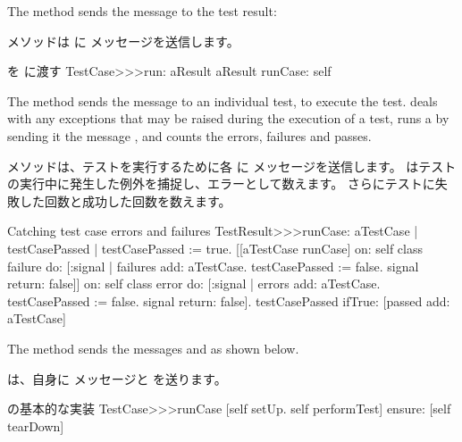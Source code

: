 \documentclass[a4paper,10pt,twoside]{book}
\begin{document}
The method
 sends the message
 to the test result:
\fi

 メソッドは  に  メッセージを送信します。

\begin{method}[testcaserun:]{ を  に渡す}
TestCase>>>run: aResult
	aResult runCase: self
\end{method}

The method  sends
the message  to an individual test, to execute the test.
 deals with 
any exceptions that may be raised during the
execution of a test, runs a  by sending it the
message , and counts the errors, failures
and passes.
\fi

 メソッドは、テストを実行するために各  に  メッセージを送信します。
 はテストの実行中に発生した例外を捕捉し、エラーとして数えます。
さらにテストに失敗した回数と成功した回数を数えます。

\begin{method}[testresultruncase]{Catching test case errors and failures}
TestResult>>>runCase: aTestCase
	| testCasePassed |
	testCasePassed := true.
	[[aTestCase runCase] 
			on: self class failure
			do: 
				[:signal | 
				failures add: aTestCase.
				testCasePassed := false.
				signal return: false]]
					on: self class error
					do:
						[:signal |
						errors add: aTestCase.
						testCasePassed := false.
						signal return: false].
	testCasePassed ifTrue: [passed add: aTestCase]
\end{method}

The method  sends the messages
 and  as shown below.
\fi

 は、自身に  メッセージと  を送ります。

\begin{method}[testcaseruncase]{ の基本的な実装}
TestCase>>>runCase
	[self setUp.
	self performTest] ensure: [self tearDown]
\end{method}
\end{document}
